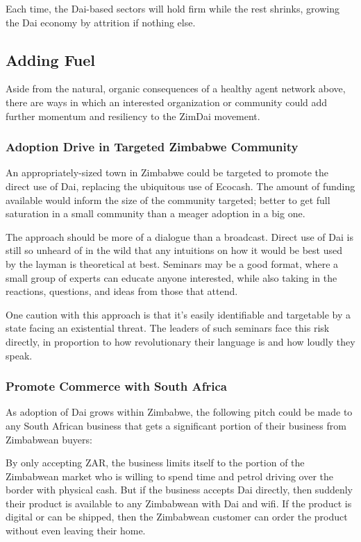 \documentclass{article}
\begin{document}
Each time, the Dai-based sectors will hold firm while the rest shrinks, growing the Dai economy by attrition if nothing else.

\subsection{Adding Fuel} \label{fuel}

Aside from the natural, organic consequences of a healthy agent network above, there are ways in which an interested organization or community could add further momentum and resiliency to the ZimDai movement.

\subsubsection{Adoption Drive in Targeted Zimbabwe Community} \label{targeted community}

An appropriately-sized town in Zimbabwe could be targeted to promote the direct use of Dai, replacing the ubiquitous use of Ecocash. The amount of funding available would inform the size of the community targeted; better to get full saturation in a small community than a meager adoption in a big one.

The approach should be more of a dialogue than a broadcast. Direct use of Dai is still so unheard of in the wild that any intuitions on how it would be best used by the layman is theoretical at best. Seminars may be a good format, where a small group of experts can educate anyone interested, while also taking in the reactions, questions, and ideas from those that attend.

One caution with this approach is that it's easily identifiable and targetable by a state facing an existential threat. The leaders of such seminars face this risk directly, in proportion to how revolutionary their language is and how loudly they speak.

\subsubsection{Promote Commerce with South Africa} \label{promote south africa}

As adoption of Dai grows within Zimbabwe, the following pitch could be made to any South African business that gets a significant portion of their business from Zimbabwean buyers:

By only accepting ZAR, the business limits itself to the portion of the Zimbabwean market who is willing to spend time and petrol driving over the border with physical cash. But if the business accepts Dai directly, then suddenly their product is available to any Zimbabwean with Dai and wifi. If the product is digital or can be shipped, then the Zimbabwean customer can order the product without even leaving their home.
\end{document}
